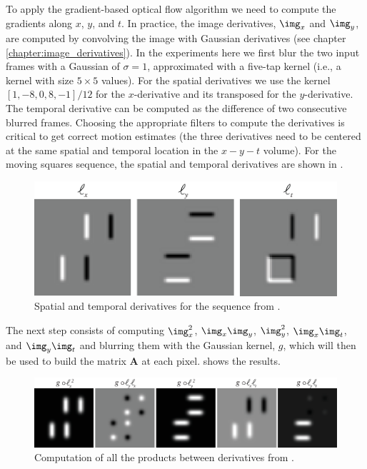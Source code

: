 To apply the gradient-based optical flow algorithm we need to compute the gradients along $x$, $y$, and $t$. In practice, the image derivatives, $\img_x$ and $\img_y$, are computed by convolving the image with Gaussian derivatives (see chapter \ref{chapter:image_derivatives}). In the experiments here we first blur the two input frames with a Gaussian of $\sigma=1$, approximated with a five-tap kernel (i.e., a kernel with size $5 \times 5$ values). For the spatial derivatives we use the kernel $[1, -8, 0, 8, -1]/12$ for the $x$-derivative and its transposed for the $y$-derivative. The temporal derivative can be computed as the difference of two consecutive blurred frames. Choosing the appropriate filters to compute the derivatives is critical to get correct motion estimates (the three derivatives need to be centered at the same spatial and temporal location in the $x-y-t$ volume). For the moving squares sequence, the spatial and temporal derivatives are shown in \fig{\ref{fig:square_grandient_based_2}}.
\vspace{-0.2in}
\begin{figure}[h!]
    \centerline{
        \includegraphics[width=.7\linewidth]{figures/optical_flow/square_grandient_based_2.eps}}
    \caption{Spatial and temporal derivatives for the sequence from \fig{\ref{fig:square_grandient_based_1}}.}
    \label{fig:square_grandient_based_2}
\end{figure}
\vspace{-0.2in}

The next step consists of computing $\img_x^2$, $\img_x\img_y$, $\img_y^2$, $\img_x\img_t$, and $\img_y\img_t$ and blurring them with the Gaussian kernel, $g$, which will then be used to build the matrix $\mathbf{A}$ at each pixel. \Fig{\ref{fig:square_grandient_based_3}} shows the results.
\begin{figure}[h!]
    \centerline{
        \includegraphics[width=1\linewidth]{figures/optical_flow/square_grandient_based_3.eps}}
    \caption{Computation of all the products between derivatives from \fig{\ref{fig:square_grandient_based_2}}.}
    \label{fig:square_grandient_based_3}
\end{figure}

